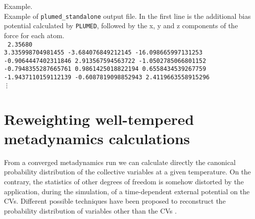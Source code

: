 \documentclass[12pt,fleqn]{report}
\newcommand{\plumed}{{\tt PLUMED}}
\newcommand{\esempio}[1]{
\vspace{10pt}
\begin{flushright}
\colorbox{light-gray}{
   \begin{minipage}{13cm}
       \scriptsize{
{\fontfamily{phv} \fontseries{b}
 \selectfont Example. \\
 \fontseries{m} \selectfont #1 } }
\end{minipage}}
\end{flushright}
\vspace{20pt}
}
\begin{document}
\esempio{Example of {\tt plumed\_standalone} output file. In the first line is the additional bias potential
calculated by \plumed, followed by the x, y and z components of the force for each atom.\\

\vspace{10pt}
{\tt
 2.35680 \\
 3.335998704981455 -3.684076849212145 -16.098665997131253 \\
 -0.9064447402311846 2.913567594563722 -1.0502785066801152 \\
 -0.7948355287665761 0.9861425018822194 0.6558434539267759 \\
 -1.9437110159112139 -0.6087819098852943 2.4119663558915296 \\
\vdots
}
}

\section{Reweighting well-tempered metadynamics calculations}

From a converged metadynamics run we can calculate directly the canonical probability distribution of the
collective variables at a given temperature.
On the contrary, the statistics of other degrees of freedom is somehow distorted by the application, 
during the simulation, of a time-dependent external potential on the CVs.
Different possible techniques have been proposed to reconstruct the probability distribution of variables other 
than the CVs \cite{Tiana:2008p9224,marinelli-trpc09,Bonomi:2009p17105}.
\end{document}
